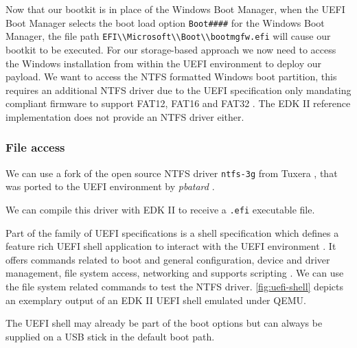 Now that our bootkit is in place of the Windows Boot Manager, when the \ac{UEFI} Boot Manager selects the boot load option \lstinline{Boot####} for the Windows Boot Manager, the file path \lstinline{EFI\\Microsoft\\Boot\\bootmgfw.efi} will cause our bootkit to be executed.
For our storage-based approach we now need to access the Windows installation from within the \ac{UEFI} environment to deploy our payload.
We want to access the \ac{NTFS} formatted Windows boot partition, this requires an additional \ac{NTFS} driver due to the \ac{UEFI} specification only mandating compliant firmware to support \ac{FAT}12, \ac{FAT}16 and \ac{FAT}32 \cite[13.3.1.1]{uefi-spec}.
The \ac{EDK} II reference implementation does not provide an \ac{NTFS} driver either.

\subsubsection{File access}

We can use a fork of the open source \ac{NTFS} driver \lstinline{ntfs-3g} from Tuxera \cite{ntfs-3g}, that was ported to the \ac{UEFI} environment by \emph{pbatard} \cite{ntfs-3g-uefi}.

We can compile this driver with \ac{EDK} II to receive a \lstinline{.efi} executable file.

Part of the family of \ac{UEFI} specifications is a shell specification which defines a feature rich \ac{UEFI} shell application to interact with the \ac{UEFI} environment \cite[1.1]{uefi-shell-spec}.
It offers commands related to boot and general configuration, device and driver management, file system access, networking \cite[5.1]{uefi-shell-spec} and supports scripting \cite[4]{uefi-shell-spec}.
We can use the file system related commands to test the \ac{NTFS} driver.
\autoref{fig:uefi-shell} depicts an exemplary output of an \ac{EDK} II \ac{UEFI} shell emulated under QEMU.

The \ac{UEFI} shell may already be part of the boot options but can always be supplied on a \ac{USB} stick in the default boot path.

